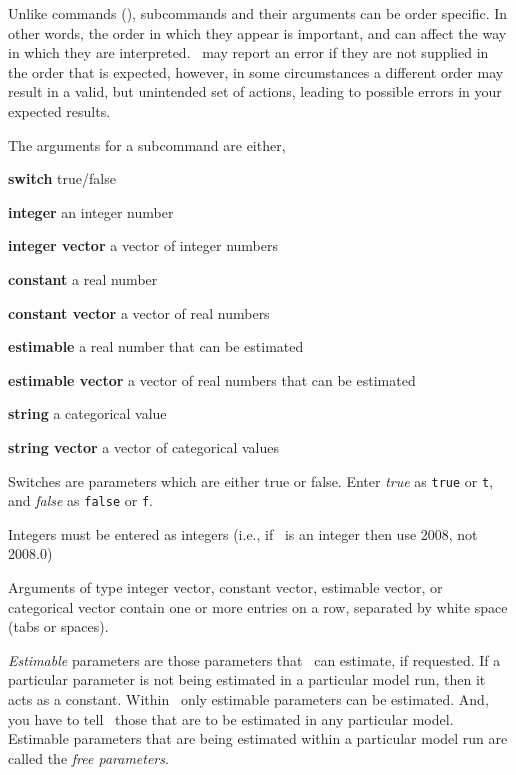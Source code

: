 Unlike commands (), subcommands and their arguments can be order specific. In other words, the order in which they appear is important, and can affect the way in which they are interpreted. \SPM\ may report an error if they are not supplied in the order that is expected, however, in some circumstances a different order may result in a valid, but unintended set of actions, leading to possible errors in your expected results.  

The arguments for a subcommand are either,

\begin{description}
\item \textbf{switch} true/false 
\item \textbf{integer} an integer number
\item \textbf{integer vector} a vector of integer numbers
\item \textbf{constant} a real number 
\item \textbf{constant vector} a vector of real numbers
\item \textbf{estimable} a real number that can be estimated
\item \textbf{estimable vector} a vector of real numbers that can be estimated
\item \textbf{string} a categorical value
\item \textbf{string vector} a vector of categorical values
\end{description}

Switches are parameters which are either true or false. Enter \emph{true} as \texttt{true} or \texttt{t}, and \emph{false} as \texttt{false} or \texttt{f}. 

Integers must be entered as integers (i.e., if \ is an integer then use 2008, not 2008.0)

Arguments of type integer vector, constant vector, estimable vector, or categorical vector contain one or more entries on a row, separated by white space (tabs or spaces). 

\emph{Estimable} parameters are those parameters that \SPM\ can estimate, if requested. If a particular parameter is not being estimated in a particular model run, then it acts as a constant.  Within \SPM\, only estimable parameters can be estimated. And, you have to tell \SPM\ those that are to be estimated in any particular model. Estimable parameters that are being estimated within a particular model run are called the \emph{free parameters}.


